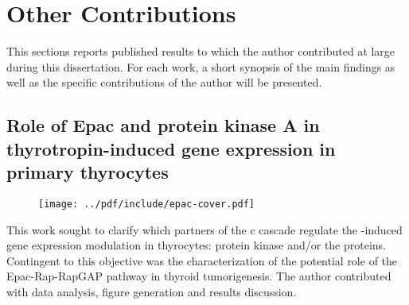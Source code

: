 
\section{Other Contributions}

This sections reports published results to which the author contributed at large
during this dissertation.  For each work, a short synopsis of the main findings
as well as the specific contributions of the author will be presented.

\subsection{Role of Epac and protein kinase A in thyrotropin-induced gene
  expression in primary thyrocytes}
\begin{figure}[h]
  \texttt{[image: ../pdf/include/epac-cover.pdf]}
\end{figure}

This work sought to clarify which partners of the c cascade
regulate the -induced gene expression modulation in thyrocytes:
protein kinase  and/or the 
proteins.\cite{van_staveren_role_2012} Contingent to this objective was the
characterization of the potential role of the Epac-Rap-RapGAP pathway in thyroid
tumorigenesis.  The author contributed with data analysis, figure generation and
results discussion.

